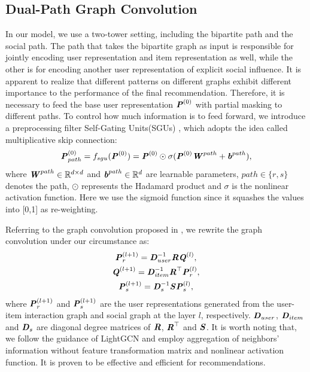 \documentclass[letterpaper]{article} %
\begin{document}
\subsection{Dual-Path Graph Convolution}
In our model, we use a two-tower setting, including the bipartite path and the social path. The path that takes the bipartite graph as input is responsible for jointly encoding user representation and item representation as well, while the other is for encoding another user representation of explicit social influence. It is apparent to realize that different patterns on different graphs exhibit different importance to the performance of the final recommendation. Therefore, it is necessary to feed the base user representation $\textbf{\textit{P}}^{(0)}$ with partial masking to different paths. To control how much information is to feed forward, we introduce a preprocessing filter Self-Gating Units(SGUs) \cite{SGU}, which adopts the idea called multiplicative skip connection:
\begin{align}
    \textbf{\textit{P}}^{(0)}_{path} = f_{sgu}(\textbf{\textit{P}}^{(0)}) = \textbf{\textit{P}}^{(0)} \odot \sigma (\textbf{\textit{P}}^{(0)}\textbf{\textit{W}}^{path} + \textbf{\textit{b}}^{path}),
\end{align}
where $\textbf{\textit{W}}^{path} \in \mathbb{R}^{d\times d}$ and $\textbf{\textit{b}}^{path} \in \mathbb{R}^{d}$ are learnable parameters, $path \in \{r,s\}$ denotes the path, $\odot$ represents the Hadamard product and $\sigma$ is the nonlinear activation function. Here we use the sigmoid function since it squashes the values into [0,1] as re-weighting.

Referring to the graph convolution proposed in \cite{GNN}, we rewrite the graph convolution under our circumstance as:
\begin{gather}
    \textbf{\textit{P}}^{(l+1)}_{r} = \textbf{\textit{D}}^{-1}_{user}\textbf{\textit{R}}\textbf{\textit{Q}}^{(l)},\\
    \textbf{\textit{Q}}^{(l+1)} = \textbf{\textit{D}}^{-1}_{item}\textbf{\textit{R}}^{\top}\textbf{\textit{P}}^{(l)}_{r},\\
    \textbf{\textit{P}}^{(l+1)}_{s} = \textbf{\textit{D}}^{-1}_{s}\textbf{\textit{S}}\textbf{\textit{P}}^{(l)}_{s},
\end{gather}
where $\textbf{\textit{P}}^{(l+1)}_{r}$ and $\textbf{\textit{P}}^{(l+1)}_{s}$ are the user representations generated from the user-item interaction graph and social graph at the layer $l$, respectively. $\textbf{\textit{D}}_{user}$, $\textbf{\textit{D}}_{item}$ and $\textbf{\textit{D}}_{s}$ are diagonal degree matrices of $\textbf{\textit{R}}$, $\textbf{\textit{R}}^{\top}$ and $\textbf{\textit{S}}$. It is worth noting that, we follow the guidance of LightGCN \cite{lightgcn} and employ aggregation of neighbors' information without feature transformation matrix and nonlinear activation function. It is proven to be effective and efficient for recommendations.
\end{document}
